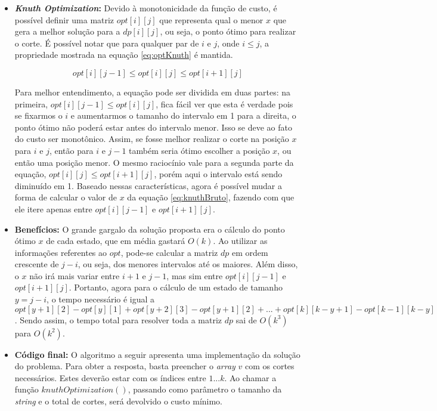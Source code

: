 \begin{itemize}[leftmargin=-.001in]
\item \textbf{\textit{Knuth Optimization}:} 
Devido à monotonicidade da função de custo, é possível definir uma matriz $opt[i][j]$ que representa qual o menor $x$ que gera a melhor solução para a $dp[i][j]$, ou seja, o ponto ótimo para realizar o corte. É possível notar que para qualquer par de $i$ e $j$, onde $i \leq j$, a propriedade mostrada na equação \ref{eq:optKnuth} é mantida.

\begin{equation}
opt[i][j-1] \leq opt[i][j] \leq opt[i+1][j]
\label{eq:optKnuth}
\end{equation}

Para melhor entendimento, a equação pode ser dividida em duas partes: na primeira, $opt[i][j-1] \leq opt[i][j]$, fica fácil ver que esta é verdade pois se fixarmos o $i$ e aumentarmos o tamanho do intervalo em 1 para a direita, o ponto ótimo não poderá estar antes do intervalo menor. Isso se deve ao fato do custo ser monotônico. Assim, se fosse melhor realizar o corte na posição $x$ para $i$ e $j$, então para $i$ e $j-1$ também seria ótimo escolher a posição $x$, ou então uma posição menor. O mesmo raciocínio vale para a segunda parte da equação, $opt[i][j] \leq opt[i+1][j]$, porém aqui o intervalo está sendo diminuído em 1.
Baseado nessas características, agora é possível mudar a forma de calcular o valor de $x$ da equação \ref{eq:knuthBruto}, fazendo com que ele itere apenas entre $opt[i][j-1]$ e $opt[i+1][j]$.

\item \textbf{Benefícios:}
O grande gargalo da solução proposta era o cálculo do ponto ótimo $x$ de cada estado, que em média gastará $O(k)$. Ao utilizar as informações referentes ao $opt$, pode-se calcular a matriz $dp$ em ordem crescente de $j-i$, ou seja, dos menores intervalos até os maiores. Além disso, o $x$ não irá mais variar entre $i+1$ e $j-1$, mas sim entre $opt[i][j-1]$ e $opt[i+1][j]$. Portanto, agora para o cálculo de um estado de tamanho $y = j-i$, o tempo necessário é igual a $opt[y+1][2] - opt[y][1] + opt[y+2][3] - opt[y+1][2] + ... + opt[k][k-y+1] - opt[k-1][k-y] = opt[k][k-d+1] - opt[k][1] = O(k)$. Sendo assim, o tempo total para resolver toda a matriz $dp$ sai de $O(k^3)$ para $O(k^2)$.
\item \textbf{Código final:} O algoritmo a seguir apresenta uma implementação da solução do problema. Para obter a resposta, basta preencher o \textit{array} $v$ com os cortes necessários. Estes deverão estar com os índices entre $1...k$. Ao chamar a função $knuthOptimization()$, passando como parâmetro o tamanho da \textit{string} e o total de cortes, será devolvido o custo mínimo.
\\


\end{itemize}

